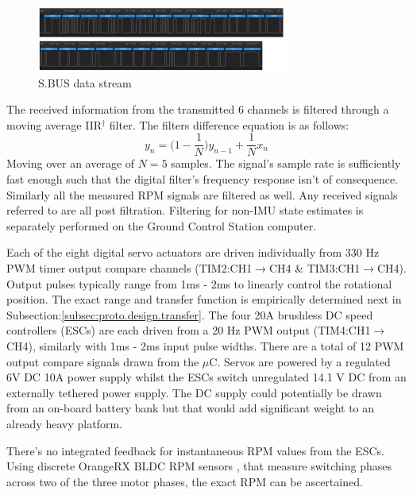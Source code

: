 \begin{figure}[hbtp]
\centering
\includegraphics[width=\textwidth]{figs/sbus}
\caption{S.BUS data stream}
\label{fig:sbus}
\vspace{-10pt}
\end{figure}
\par
{\color{red}
The received information from the transmitted 6 channels is filtered through a moving average IIR$^\dagger$ filter. The filters difference equation is as follows: 
\begin{equation}
y_n = \big(1-\frac{1}{N}\big)y_{n-1}+\frac{1}{N}x_n
\end{equation}
Moving over an average of $N=5$ samples. The signal's sample rate is sufficiently fast enough such that the digital filter's frequency response isn't of consequence. Similarly all the measured RPM signals are filtered as well. Any received signals referred to are all post filtration. Filtering for non-IMU state estimates is separately performed on the Ground Control Station computer.}
\par
Each of the eight digital servo actuators are driven individually from 330 Hz PWM timer output compare channels (TIM2:CH1$\rightarrow$CH4 \& TIM3:CH1$\rightarrow$CH4). Output pulses typically range from 1ms - 2ms to linearly control the rotational position. The exact range and transfer function is empirically determined next in Subsection:\ref{subsec:proto.design.transfer}. The four 20A brushless DC speed controllers (ESCs) are each driven from a 20 Hz PWM output (TIM4:CH1$\rightarrow$CH4), similarly with 1ms - 2ms input pulse widths. There are a total of 12 PWM output compare signals drawn from the $\mu$C. Servos are powered by a regulated 6V DC 10A power supply \cite{rotorstar} whilst the ESCs switch unregulated 14.1 V DC from an externally tethered power supply. The DC supply could potentially be drawn from an on-board battery bank but that would add significant weight to an already heavy platform.
\par
There's no integrated feedback for instantaneous RPM values from the ESCs. Using discrete OrangeRX BLDC RPM sensors \cite{orangerpm}, that measure switching phases across two of the three motor phases, the exact RPM can be ascertained.
